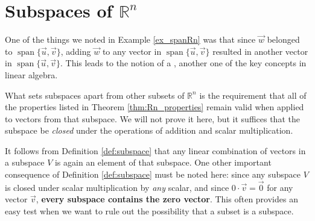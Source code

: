 \section{Subspaces of $\mathbb{R}^n$}\label{sec:subspace}



One of the things we noted in Example \ref{ex_spanRn} was that since $\vec{w}$ belonged to $\operatorname{span}\{\vec{u},\vec{v}\}$, adding $\vec{w}$ to any vector in $\operatorname{span}\{\vec{u},\vec{v}\}$ resulted in another vector in $\operatorname{span}\{\vec{u},\vec{v}\}$. This leads to the notion of a , another one of the key concepts in linear algebra.

What sets subspaces apart from other subsets of $\mathbb{R}^n$ is the requirement that all of the properties listed in Theorem \ref{thm:Rn_properties} remain valid when applied to vectors from that subspace. We will not prove it here, but it suffices that the subspace be \textit{closed} under the operations of addition and scalar multiplication.

\smallskip


\smallskip



It follows from Definition \ref{def:subspace} that any linear combination of vectors in a subspace $V$ is again an element of that subspace. One other important consequence of Definition \ref{def:subspace} must be noted here: since any subspace $V$ is closed under scalar multiplication by \textit{any} scalar, and since $0\cdot\vec v = \vec 0$ for any vector $\vec v$, \textbf{every subspace contains the zero vector}. This often provides an easy test when we want to rule out the possibility that a subset is a subspace.

